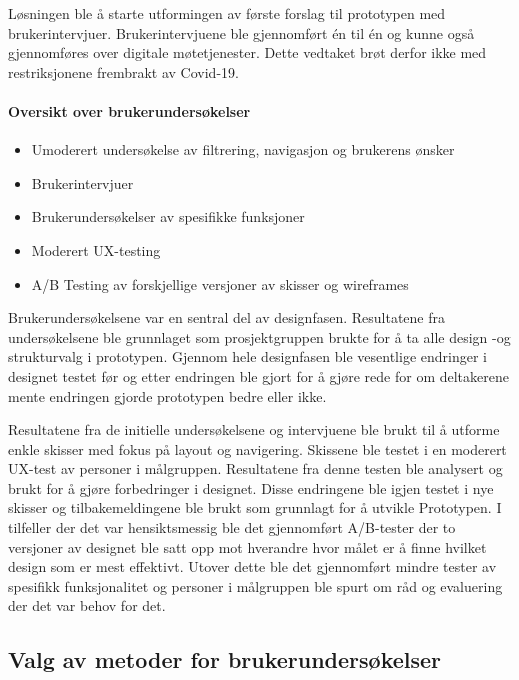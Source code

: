 Løsningen ble å starte utformingen av første forslag til prototypen med brukerintervjuer. Brukerintervjuene ble gjennomført én til én og kunne også gjennomføres over digitale møtetjenester. Dette vedtaket brøt derfor ikke med restriksjonene frembrakt av Covid-19.

\paragraph{Oversikt over brukerundersøkelser}
\begin{itemize}
\item Umoderert undersøkelse av filtrering, navigasjon og brukerens ønsker
\item Brukerintervjuer
\item Brukerundersøkelser av spesifikke funksjoner
\item Moderert UX-testing
\item A/B Testing av forskjellige versjoner av skisser og wireframes
\end{itemize}

Brukerundersøkelsene var en sentral del av designfasen. Resultatene fra undersøkelsene ble grunnlaget som prosjektgruppen brukte for å ta alle design -og strukturvalg i prototypen. Gjennom hele designfasen ble vesentlige endringer i designet testet før og etter endringen ble gjort for å gjøre rede for om deltakerene mente endringen gjorde prototypen bedre eller ikke.

Resultatene fra de initielle undersøkelsene og intervjuene ble brukt til å utforme enkle skisser med fokus på layout og navigering. Skissene ble testet i en moderert UX-test av personer i målgruppen. Resultatene fra denne testen ble analysert og brukt for å gjøre forbedringer i designet. Disse endringene ble igjen testet i nye skisser og tilbakemeldingene ble brukt som grunnlagt for å utvikle Prototypen. I tilfeller der det var hensiktsmessig ble det gjennomført A/B-tester der to versjoner av designet ble satt opp mot hverandre hvor målet er å finne hvilket design som er mest effektivt. Utover dette ble det gjennomført mindre tester av spesifikk funksjonalitet og personer i målgruppen ble spurt om råd og evaluering der det var behov for det.

\subsection{Valg av metoder for brukerundersøkelser}



